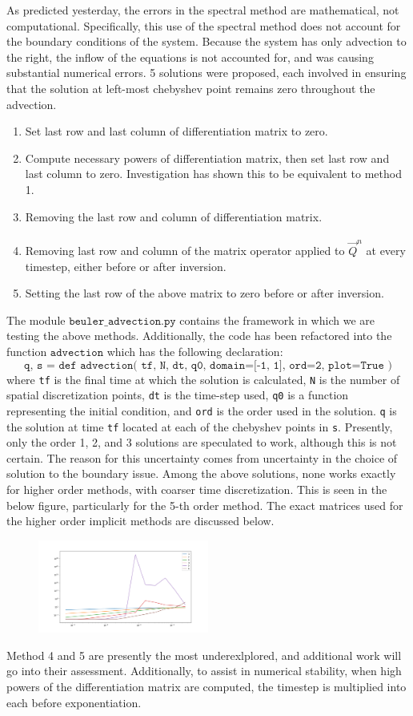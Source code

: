 
As predicted yesterday, the errors in the spectral method are mathematical, not computational.
Specifically, this use of the spectral method does not account for the boundary conditions of the system.
Because the system has only advection to the right, the inflow of the equations is not accounted for, and was causing substantial numerical errors. 
5 solutions were proposed, each involved in ensuring that the solution at left-most chebyshev point remains zero throughout the advection.
\begin{enumerate}
	\item Set last row and last column of differentiation matrix to zero.
	\item Compute necessary powers of differentiation matrix, then set last row and last column to zero.
	Investigation has shown this to be equivalent to method 1.
	\item Removing the last row and column of differentiation matrix.
	\item Removing last row and column of the matrix operator applied to $\hat{\vec{Q}^n}$ at every timestep, either before or after inversion.
	\item Setting the last row of the above matrix to zero before or after inversion.
\end{enumerate}
The module $\texttt{beuler\_advection.py}$ contains the framework in which we are testing the above methods.
Additionally, the code has been refactored into the function $\texttt{advection}$ which has the following declaration:
$$\texttt{q, s = def advection( tf, N, dt, q0, domain=[-1, 1], ord=2, plot=True )}$$
where \texttt{tf} is the final time at which the solution is calculated, \texttt{N} is the number of spatial discretization points, \texttt{dt} is the time-step used, \texttt{q0} is a function representing the initial condition, and \texttt{ord} is the order used in the solution.
\texttt{q} is the solution at time \texttt{tf} located at each of the chebyshev points in \texttt{s}. 
Presently, only the order 1, 2, and 3 solutions are speculated to work, although this is not certain.
The reason for this uncertainty comes from uncertainty in the choice of solution to the boundary issue.
Among the above solutions, none works exactly for higher order methods, with coarser time discretization.
This is seen in the below figure, particularly for the 5-th order method.
The exact matrices used for the higher order implicit methods are discussed below.
\begin{figure}[H]
	\centering
	\includegraphics[width=0.5\textwidth]{bad_order_rates.png}
\end{figure}
Method 4 and 5 are presently the most underexlplored, and additional work will go into their assessment. 
Additionally, to assist in numerical stability, when high powers of the differentiation matrix are computed, the timestep is multiplied into each before exponentiation.